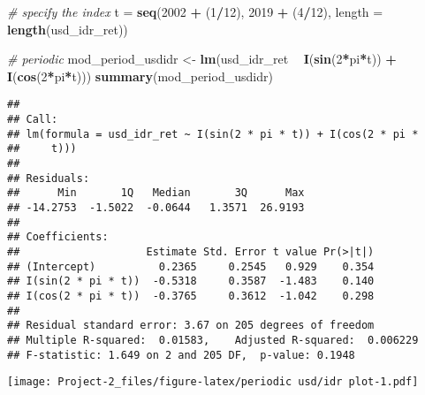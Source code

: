 \documentclass[]{article}
\newenvironment{Shaded}{\begin{snugshade}}{\end{snugshade}}
\newcommand{\KeywordTok}[1]{\textcolor[rgb]{0.13,0.29,0.53}{\textbf{#1}}}
\newcommand{\DataTypeTok}[1]{\textcolor[rgb]{0.13,0.29,0.53}{#1}}
\newcommand{\DecValTok}[1]{\textcolor[rgb]{0.00,0.00,0.81}{#1}}
\newcommand{\StringTok}[1]{\textcolor[rgb]{0.31,0.60,0.02}{#1}}
\newcommand{\CommentTok}[1]{\textcolor[rgb]{0.56,0.35,0.01}{\textit{#1}}}
\newcommand{\OperatorTok}[1]{\textcolor[rgb]{0.81,0.36,0.00}{\textbf{#1}}}
\newcommand{\NormalTok}[1]{#1}
\begin{document}
\begin{Shaded}
\begin{Highlighting}[]
\CommentTok{# specify the index}
\NormalTok{t =}\StringTok{ }\KeywordTok{seq}\NormalTok{(}\DecValTok{2002} \OperatorTok{+}\StringTok{ }\NormalTok{(}\DecValTok{1}\OperatorTok{/}\DecValTok{12}\NormalTok{), }\DecValTok{2019} \OperatorTok{+}\StringTok{ }\NormalTok{(}\DecValTok{4}\OperatorTok{/}\DecValTok{12}\NormalTok{), }\DataTypeTok{length =} \KeywordTok{length}\NormalTok{(usd_idr_ret))}

\CommentTok{# periodic}
\NormalTok{mod_period_usdidr <-}\StringTok{ }\KeywordTok{lm}\NormalTok{(usd_idr_ret }\OperatorTok{~}\StringTok{ }\KeywordTok{I}\NormalTok{(}\KeywordTok{sin}\NormalTok{(}\DecValTok{2}\OperatorTok{*}\NormalTok{pi}\OperatorTok{*}\NormalTok{t)) }\OperatorTok{+}\StringTok{ }\KeywordTok{I}\NormalTok{(}\KeywordTok{cos}\NormalTok{(}\DecValTok{2}\OperatorTok{*}\NormalTok{pi}\OperatorTok{*}\NormalTok{t)))}
\KeywordTok{summary}\NormalTok{(mod_period_usdidr)}
\end{Highlighting}
\end{Shaded}

\begin{verbatim}
## 
## Call:
## lm(formula = usd_idr_ret ~ I(sin(2 * pi * t)) + I(cos(2 * pi * 
##     t)))
## 
## Residuals:
##      Min       1Q   Median       3Q      Max 
## -14.2753  -1.5022  -0.0644   1.3571  26.9193 
## 
## Coefficients:
##                    Estimate Std. Error t value Pr(>|t|)
## (Intercept)          0.2365     0.2545   0.929    0.354
## I(sin(2 * pi * t))  -0.5318     0.3587  -1.483    0.140
## I(cos(2 * pi * t))  -0.3765     0.3612  -1.042    0.298
## 
## Residual standard error: 3.67 on 205 degrees of freedom
## Multiple R-squared:  0.01583,    Adjusted R-squared:  0.006229 
## F-statistic: 1.649 on 2 and 205 DF,  p-value: 0.1948
\end{verbatim}

\begin{Shaded}
\end{Shaded}

\texttt{[image: Project-2\_files/figure-latex/periodic usd/idr plot-1.pdf]}
\end{document}
